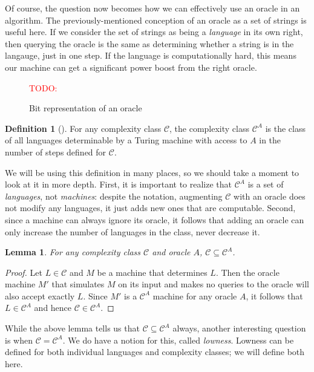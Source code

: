 \documentclass[english,12pt]{reedthesis}
\theoremstyle{plain}
\newtheorem{lemma}[lemma]{Lemma}
\theoremstyle{definition}
\newtheorem{defn}[defn]{Definition}
\theoremstyle{remark}
\newcommand{\TODO}[1]{\textcolor{red}{TODO: #1}}
\begin{document}
Of course, the question now becomes how we can effectively use an oracle in an
algorithm. The previously-mentioned conception of an oracle as a set of strings
is useful here. If we consider the set of strings as being a \emph{language} in
its own right, then querying the oracle is the same as determining whether a
string is in the langauge, just in one step. If the language is computationally
hard, this means our machine can get a significant power boost from the right
oracle.

\begin{figure}[htbp]
  \TODO{}
  \caption{Bit representation of an oracle}\label{fig:oracle-bits}
\end{figure}

\begin{defn}[{\cite[Def.\ 2.1]{AW09}}]\label{def:oracle-class}
  For any complexity class $\mathcal{C}$, the complexity class $\mathcal{C}^{A}$ is the class of all
  languages determinable by a Turing machine with access to $A$ in the number of
  steps defined for $\mathcal{C}$.
\end{defn}

We will be using this definition in many places, so we should take a moment to
look at it in more depth. First, it is important to realize that $\mathcal{C}^{A}$ is a
set of \emph{languages}, not \emph{machines}: despite the notation, augmenting
$\mathcal{C}$ with an oracle does not modify any languages, it just adds new ones that are
computable. Second, since a machine can always ignore its oracle, it follows
that adding an oracle can only increase the number of languages in the class,
never decrease it.

\begin{lemma}\label{thm:relativizing-increases}
  For any complexity class $\mathcal{C}$ and oracle $A$, $\mathcal{C} \subseteq \mathcal{C}^{A}$.
\end{lemma}

\begin{proof}
  Let $L \in \mathcal{C}$ and $M$ be a machine that determines $L$. Then the oracle machine
  $M'$ that simulates $M$ on its input and makes no queries to the oracle will
  also accept exactly $L$. Since $M'$ is a $\mathcal{C}^{A}$ machine for any oracle $A$,
  it follows that $L \in \mathcal{C}^{A}$ and hence $\mathcal{C} \in \mathcal{C}^{A}$.
\end{proof}

While the above lemma tells us that $\mathcal{C} \subseteq \mathcal{C}^{A}$ always, another interesting
question is when $\mathcal{C} = \mathcal{C}^{A}$. We do have a notion for this, called
\emph{lowness}. Lowness can be defined for both individual languages and
complexity classes; we will define both here.
\end{document}
